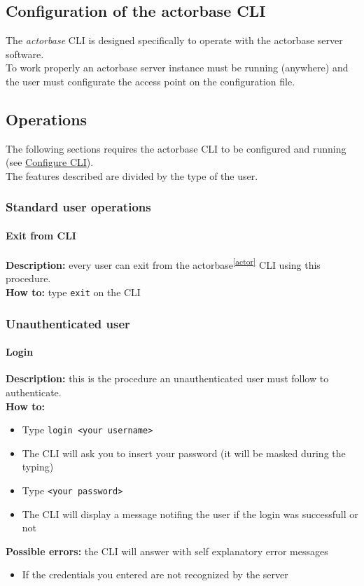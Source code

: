 \documentclass{scalatekids-article}
\begin{document}
\subsection{Configuration of the actorbase CLI}
\label{sec:configurationcli}
The \textit{actorbase} CLI is designed specifically to operate
with the actorbase server software.\\
To work properly an actorbase server instance must be running
(anywhere) and the user must configurate the access point on the configuration file.

\subsection{Operations}

The following sections requires the actorbase CLI to be configured and
running (see \hyperref[sec:configurationcli]{Configure CLI}).\\
The features described are divided by the type of the user.

\subsubsection{Standard user operations}
\label{sec:everyuser}
\paragraph{Exit from CLI}

\textbf{Description:} every user can exit from the actorbase\textsuperscript{\ref{actor}} CLI
using this procedure.\\
\textbf{How to:} type \texttt{exit} on the CLI

\subsubsection{Unauthenticated user}
\label{sec:unauthenticateduser}

\paragraph{Login}

\textbf{Description:} this is the procedure an unauthenticated user must follow to authenticate.\\
\textbf{How to:}
\begin{itemize}
\item Type \texttt{login <your username>}
\item The CLI will ask you to insert your password (it will be masked during the typing)
\item Type \texttt{<your password>}
\item The CLI will display a message notifing the user if the login was successfull or not
\end{itemize}
\textbf{Possible errors:} the CLI will answer with self explanatory error messages
\begin{itemize}
\item If the credentials you entered are not recognized by the server
\end{itemize}
\end{document}
